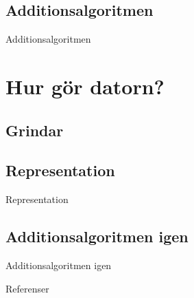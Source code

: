 \documentclass{beamer}
\begin{document}
\subsection{Additionsalgoritmen}
\begin{frame}{Additionsalgoritmen}
\end{frame}


\section{Hur gör datorn?}

\subsection{Grindar}
\begin{frame}
\end{frame}

\subsection{Representation}
\begin{frame}{Representation}
\end{frame}

\subsection{Additionsalgoritmen igen}
\begin{frame}{Additionsalgoritmen igen}
\end{frame}



\begin{frame}{Referenser}
	
\end{frame}
\end{document}
